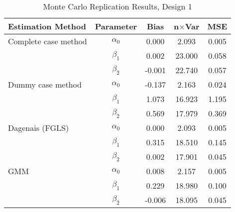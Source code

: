 \begin{table}
\centering
\caption{Monte Carlo Replication Results, Design 1}
\label{table:MCReplicationResultsDesign1}
\begin{tabular}{lcccc}
\toprule
Estimation Method & Parameter & Bias & n$\times$Var & MSE \\
\midrule
Complete case method & $\alpha_0$ & 0.000 & 2.093 & 0.005 \\
 & $\beta_1$ & 0.002 & 23.000 & 0.058 \\
 & $\beta_2$ & -0.001 & 22.740 & 0.057 \\
Dummy case method & $\alpha_0$ & -0.137 & 2.163 & 0.024 \\
 & $\beta_1$ & 1.073 & 16.923 & 1.195 \\
 & $\beta_2$ & 0.569 & 17.979 & 0.369 \\
Dagenais (FGLS) & $\alpha_0$ & 0.000 & 2.093 & 0.005 \\
 & $\beta_1$ & 0.315 & 18.510 & 0.145 \\
 & $\beta_2$ & 0.002 & 17.901 & 0.045 \\
GMM & $\alpha_0$ & 0.008 & 2.157 & 0.005 \\
 & $\beta_1$ & 0.229 & 18.980 & 0.100 \\
 & $\beta_2$ & -0.006 & 18.095 & 0.045 \\
\bottomrule
\end{tabular}
\end{table}
